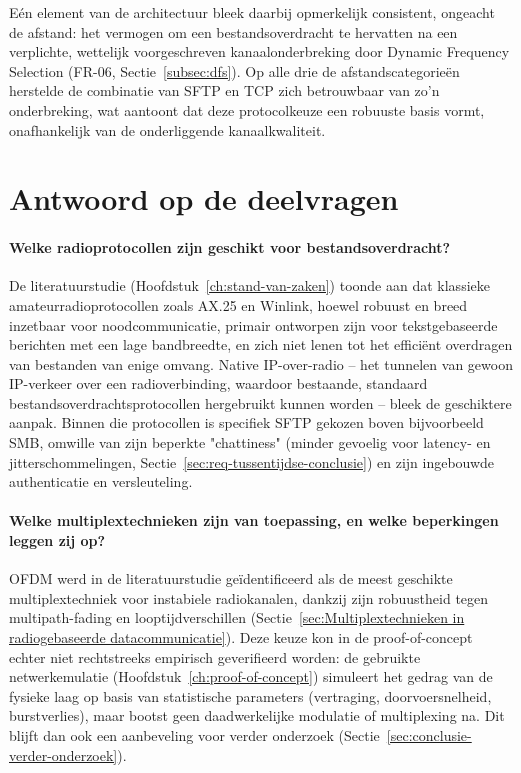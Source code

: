Eén element van de architectuur bleek daarbij opmerkelijk consistent, ongeacht de
afstand: het vermogen om een bestandsoverdracht te hervatten na een verplichte,
wettelijk voorgeschreven kanaalonderbreking door Dynamic Frequency Selection (FR-06,
Sectie~\ref{subsec:dfs}). Op alle drie de afstandscategorieën herstelde de combinatie
van SFTP en TCP zich betrouwbaar van zo'n onderbreking, wat aantoont dat deze
protocolkeuze een robuuste basis vormt, onafhankelijk van de onderliggende
kanaalkwaliteit.
 
\section{Antwoord op de deelvragen}%
\label{sec:conclusie-deelvragen}
 
\paragraph{Welke radioprotocollen zijn geschikt voor bestandsoverdracht?} De
literatuurstudie (Hoofdstuk~\ref{ch:stand-van-zaken}) toonde aan dat klassieke
amateurradioprotocollen zoals AX.25 en Winlink, hoewel robuust en breed inzetbaar voor
noodcommunicatie, primair ontworpen zijn voor tekstgebaseerde berichten met een lage
bandbreedte, en zich niet lenen tot het efficiënt overdragen van bestanden van
enige omvang. Native IP-over-radio -- het tunnelen van gewoon IP-verkeer over een
radioverbinding, waardoor bestaande, standaard bestandsoverdrachtsprotocollen hergebruikt
kunnen worden -- bleek de geschiktere aanpak. Binnen die protocollen is specifiek SFTP
gekozen boven bijvoorbeeld SMB, omwille van zijn beperkte "chattiness" (minder
gevoelig voor latency- en jitterschommelingen, Sectie~\ref{sec:req-tussentijdse-conclusie})
en zijn ingebouwde authenticatie en versleuteling.
 
\paragraph{Welke multiplextechnieken zijn van toepassing, en welke beperkingen leggen
zij op?} OFDM werd in de literatuurstudie geïdentificeerd als de meest geschikte
multiplextechniek voor instabiele radiokanalen, dankzij zijn robuustheid tegen
multipath-fading en looptijdverschillen (Sectie~\ref{sec:Multiplextechnieken in radiogebaseerde datacommunicatie}).
Deze keuze kon in de proof-of-concept echter niet rechtstreeks empirisch geverifieerd
worden: de gebruikte netwerkemulatie (Hoofdstuk~\ref{ch:proof-of-concept}) simuleert het
gedrag van de fysieke laag op basis van statistische parameters (vertraging,
doorvoersnelheid, burstverlies), maar bootst geen daadwerkelijke modulatie of
multiplexing na. Dit blijft dan ook een aanbeveling voor verder onderzoek
(Sectie~\ref{sec:conclusie-verder-onderzoek}).
 
